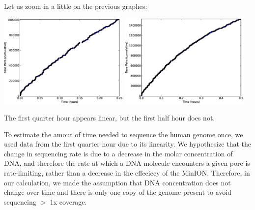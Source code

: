 

Let us zoom in a little on the previous graphes: 


\includegraphics[width=0.48\textwidth]{q4qh}
\includegraphics[width=0.48\textwidth]{q4hh}

The first quarter hour appears linear, but the first half hour does not.

To estimate the amout of time needed to sequence the human genome once, 
we used data from the first quarter hour due to its linearity.  We hypothesize 
that the change in sequencing rate is due to a decrease in the molar concentration 
of DNA, and therefore the rate at which a DNA molecule encounters a given pore is 
rate-limiting, rather than a decrease in the effeciecy of the MinION.  Therefore, 
in our calculation, we made the assumption that DNA concentration does not change 
over time and there is only one copy of the genome present to avoid sequencing 
$>$ 1x coverage. 


